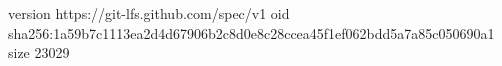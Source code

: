 version https://git-lfs.github.com/spec/v1
oid sha256:1a59b7c1113ea2d4d67906b2c8d0e8c28ccea45f1ef062bdd5a7a85c050690a1
size 23029
